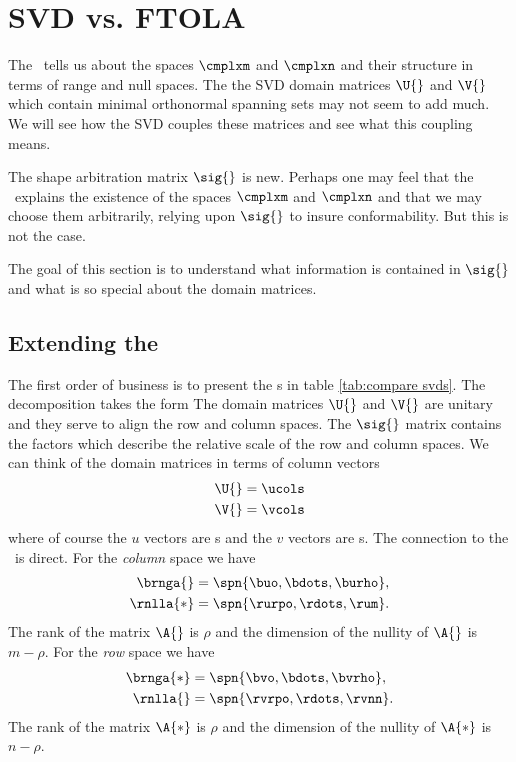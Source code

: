 \section{SVD vs. FTOLA}
The \ft \ tells us about the spaces $\cmplxm$ and $\cmplxn$ and their structure in terms of range and null spaces. The the SVD domain matrices $\U{}$ and $\V{}$ which contain minimal orthonormal spanning sets may not seem to add much. We will see how the SVD couples these matrices and see what this coupling means.

The shape arbitration matrix $\sig{}$ is new. Perhaps one may feel that the \ft \ explains the existence of the spaces $\cmplxm$ and $\cmplxn$ and that we may choose them arbitrarily, relying upon $\sig{}$ to insure conformability. But this is not the case.

The goal of this section is to understand what information is contained in $\sig{}$ and what is so special about the domain matrices.


\subsection{Extending the \ft}
The first order of business is to present the \asvd s in table \eqref{tab:compare svds}. The decomposition takes the form
The domain matrices $\U{}$ and $\V{}$ are unitary and they serve to align the row and column spaces. The $\sig{}$ matrix contains the factors which describe the relative scale of the row and column spaces. We can think of the domain matrices in terms of column vectors
\begin{equation}
  \begin{split}
    \U{} &= \ucols \\
    \V{} &= \vcols
  \end{split}
  \label{eq:ex nihilo:domains}
\end{equation}
where of course the $u$ vectors are \mv s and the $v$ vectors are \nv s.
The connection to the \ftola \ is direct. For the \emph{column} space we have
\begin{equation}
  \begin{split}
    \brnga{}  &= \spn{\buo, \bdots, \burho} , \\
    \rnlla{*} &= \spn{\rurpo, \rdots, \rum} .
  \end{split}
  \label{eq:ex nihilo:codomain}
\end{equation}
The rank of the matrix $\A{}$ is $\rho$ and the dimension of the nullity of $\A{}$ is $m-\rho$. For the \emph{row} space we have
\begin{equation}
  \begin{split}
    \brnga{*} &= \spn{\bvo, \bdots, \bvrho} , \\
    \rnlla{}  &= \spn{\rvrpo, \rdots, \rvnn} .
  \end{split}
  \label{eq:ex nihilo:domain}
\end{equation}
The rank of the matrix $\A{*}$ is $\rho$ and the dimension of the nullity of $\A{*}$ is $n-\rho$.

